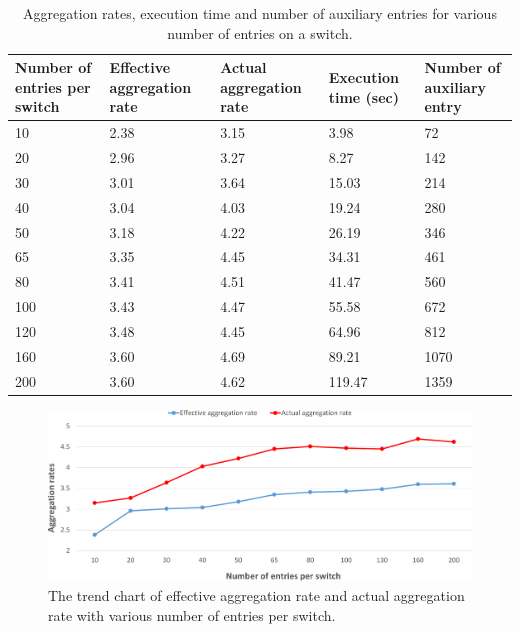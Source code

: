 \begin{table}
\centering
\caption{Aggregation rates, execution time and number of auxiliary entries for various number of entries on a switch.}
\begin{tabular}{|p{1.8cm}|p{2.6cm}|p{2.6cm}|p{1.9cm}|p{2.8cm}|}
\hline Number of entries per switch & Effective aggregation rate & Actual aggregation rate & Execution time (sec) & Number of auxiliary entry \\
\hline
\hline 10 & 2.38 & 3.15 & 3.98 & 72 \\
\hline 20 & 2.96 & 3.27 & 8.27 & 142 \\
\hline 30 & 3.01 & 3.64 & 15.03 & 214 \\
\hline 40 & 3.04 & 4.03 & 19.24 & 280 \\
\hline 50 & 3.18 & 4.22 & 26.19 & 346 \\
\hline 65 & 3.35 & 4.45 & 34.31 & 461 \\
\hline 80 & 3.41 & 4.51 & 41.47 & 560 \\
\hline 100 & 3.43 & 4.47 & 55.58 & 672 \\
\hline 120 & 3.48 & 4.45 & 64.96 & 812 \\
\hline 160 & 3.60 & 4.69 & 89.21 & 1070 \\
\hline 200 & 3.60 & 4.62 & 119.47 & 1359 \\
\hline 
\end{tabular}
\label{table:different_entry_per_switch}
\end{table}

\begin{figure}
\centering
\includegraphics[width=1\textwidth]{figures/exp_entrynum_trend.pdf}
\caption{The trend chart of effective aggregation rate and actual aggregation rate with various number of entries per switch.}
\label{exp_entrynum_trend}
\end{figure}

